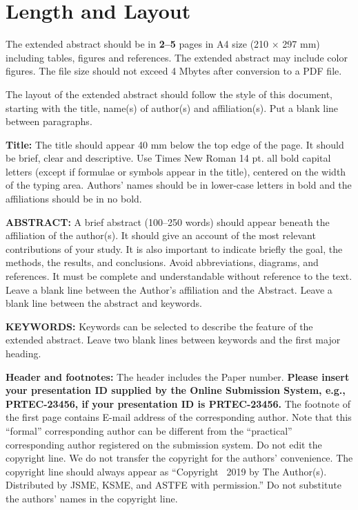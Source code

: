 \documentclass[upint,varvw]{prtec}
\begin{document}
\section{Length and Layout}

The extended abstract should be in \textbf{2--5} pages in A4 size (210 $\times$ 297 mm) including tables, figures and references. The extended abstract may include color figures. The file size should not exceed 4 Mbytes after conversion to a PDF file. 

The layout of the extended abstract should follow the style of this document, starting with the title, name(s) of author(s) and affiliation(s). Put a blank line between paragraphs.

\textbf{Title:} The title should appear 40 mm below the top edge of the page.  It should be brief, clear and descriptive. Use Times New Roman 14 pt. all bold capital letters (except if formulae or symbols appear in the title), centered on the width of the typing area. Authors' names should be in lower-case letters in bold and the affiliations should be in no bold.

\textbf{ABSTRACT:} A brief abstract (100--250 words) should appear beneath the affiliation of the author(s). It should give an account of the most relevant contributions of your study. It is also important to indicate briefly the goal, the methods, the results, and conclusions. Avoid abbreviations, diagrams, and references. It must be complete and understandable without reference to the text. Leave a blank line between the Author's affiliation and the Abstract. Leave a blank line between the abstract and keywords.

\textbf{KEYWORDS:} Keywords can be selected to describe the feature of the extended abstract. Leave two blank lines between keywords and the first major heading.

\textbf{Header and footnotes:} The header includes the Paper number. \textbf{Please insert your presentation ID supplied by the Online Submission System, e.g., PRTEC-23456, if your presentation ID is PRTEC-23456.} The footnote of the first page contains E-mail address of the corresponding author. Note that this ``formal'' corresponding author can be different from the ``practical'' corresponding author registered on the submission system. Do not edit the copyright line. We do not transfer the copyright for the authors' convenience. The copyright line should always appear as ``Copyright \textcopyright\ 2019 by The Author(s). Distributed by JSME, KSME, and ASTFE with permission.'' Do not substitute the authors' names in the copyright line.
\end{document}
